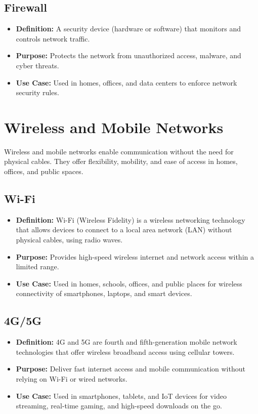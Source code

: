 \subsection{Firewall}
\begin{itemize}[leftmargin=1.5cm]
  \item \textbf{Definition:} A security device (hardware or software) that monitors and controls network traffic.
  \item \textbf{Purpose:} Protects the network from unauthorized access, malware, and cyber threats.
  \item \textbf{Use Case:} Used in homes, offices, and data centers to enforce network security rules.
\end{itemize}

\section{Wireless and Mobile Networks}

Wireless and mobile networks enable communication without the need for physical cables. They offer flexibility, mobility, and ease of access in homes, offices, and public spaces.

\subsection{Wi-Fi}
\begin{itemize}[leftmargin=1.5cm]
  \item \textbf{Definition:} Wi-Fi (Wireless Fidelity) is a wireless networking technology that allows devices to connect to a local area network (LAN) without physical cables, using radio waves.
  \item \textbf{Purpose:} Provides high-speed wireless internet and network access within a limited range.
  \item \textbf{Use Case:} Used in homes, schools, offices, and public places for wireless connectivity of smartphones, laptops, and smart devices.
\end{itemize}

\subsection{4G/5G}
\begin{itemize}[leftmargin=1.5cm]
  \item \textbf{Definition:} 4G and 5G are fourth and fifth-generation mobile network technologies that offer wireless broadband access using cellular towers.
  \item \textbf{Purpose:} Deliver fast internet access and mobile communication without relying on Wi-Fi or wired networks.
  \item \textbf{Use Case:} Used in smartphones, tablets, and IoT devices for video streaming, real-time gaming, and high-speed downloads on the go.
\end{itemize}

